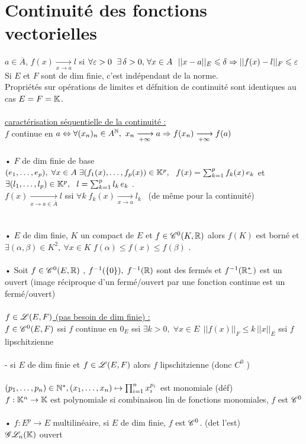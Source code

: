 \documentclass[12 pt]{book}
\begin{document}
\section*{Continuité des fonctions vectorielles}
$a\in \overline{A}, \, f(x)\xrightarrow[x\to a]{} l$ si $\forall \varepsilon>0 \ \; \exists \, \delta>0 , \, \forall x\in A \ \ ||x-a||_E\leqslant \delta \Rightarrow ||f(x) - l||_F \leqslant \varepsilon$\\
Si $E$ et $F$ sont de dim finie, c'est indépendant de la norme.\\
Propriétés sur opérations de limites et défnition de continuité sont identiques au cas $E=F=\mathbb{K}$.\\
\text{}\\
\underline{caractérisation séquentielle de la continuité :}\\
$f$ continue en $a \Da \forall(x_n)_n\in A^\N , \ x_n\TI a \Ra f(x_n)\TI f(a)$\\
\text{}\\
• $F$ de dim finie de base $(e_1,\dots,e_p), \; \forall x\in A \; \exists(f_1(x),\dots,f_p(x))\in\mathbb{K}^p, \ \ f(x) = \sum_{k=1}^p f_k(x) \, e_k$ et $\exists (l_1,\dots,l_p)\in\mathbb{K}^p, \ \ l = \sum_{k=1}^p l_k \, e_k $ .\\
$f(x) \xrightarrow[x\to a\in\overline{A}]{} l$ ssi $\forall k \; f_k(x) \xrightarrow[x\to a]{} l_k$ \ (de même pour la continuité)\\
\text{}\\
\text{}\\
• $E$ de dim finie, $K$ un compact de $E$ et $f\in\mathscr{C}^0(K,\mathbb{R})$ alors $f(K)$ est borné et $\exists (\alpha,\beta)\in K^2, \ \forall x\in K \; f(\alpha)\leqslant f(x) \leqslant f(\beta)$ .\\
\text{}\\
• Soit $f\in \mathscr{C}^0(E,\mathbb{R})$ , $f^{-1}(\{0\}), \; f^{-1}(\mathbb{R})$ sont des fermés et $f^{-1}(\mathbb{R}_-^*)$ est un ouvert (image réciproque d'un fermé/ouvert par une fonction continue est un fermé/ouvert)\\

\text{}\\
\underline{$f\in\mathscr{L}(E,F)$ (pas besoin de dim finie) :}\\
$f\in \mathscr{C}^0(E,F)$ ssi $f$ continue en $0_E$ ssi $\exists k>0, \; \forall x\in E \ \ ||f(x)||_F \leqslant k \, ||x||_E$ ssi $f$ lipschitzienne\\
\text{}\\
- si $E$ de dim finie et $f\in\mathscr{L}(E,F)$ alors $f$ lipschitzienne (donc $C^0$ )\\
\text{}\\
$(p_1,\dots,p_n)\in\mathbb{N}^*, (x_1,\dots,x_n) \mapsto \prod_{i=1}^n x_i^{p_i}$ est monomiale (déf)\\
$f : \mathbb{K}^n \to \mathbb{K}$ est polynomiale si combinaison lin de fonctions monomiales, $f$ est $\mathscr{C}^0$\\
\text{}\\
• $f:E^p\to E$ multilinéaire, si $E$ de dim finie, $f$ est $\mathscr{C}^0$. (det l'est)\\
$\mathscr{G}\mathscr{L}_n(\mathbb{K})$ ouvert\\
\end{document}
